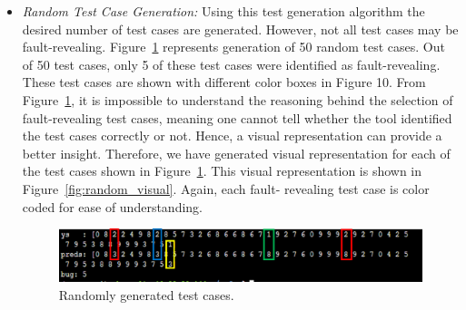 \begin{itemize}
	\item \textit{Random Test Case Generation:} Using this test generation algorithm the desired number of test cases are generated. However, not all test cases may be fault-revealing. Figure~\ref{fig:random} represents generation of 50 random test cases. Out of 50 test cases, only 5 of these test cases were identified as fault-revealing. These test cases are shown with different color boxes in Figure 10. From Figure~\ref{fig:random}, it is impossible to understand the reasoning behind the selection of fault-revealing test cases, meaning one cannot tell whether the tool identified the test cases correctly or not. Hence, a visual representation can provide a better insight. Therefore, we have generated visual representation for each of the test cases shown in Figure~\ref{fig:random}. This visual representation is shown in Figure~\ref{fig:random_visual}. Again, each fault- revealing test case is color coded for ease of understanding. 
	\begin{figure}[h]
		\includegraphics[width=\linewidth]{Fig/random.png}
		\caption{Randomly generated test cases.}
		\label{fig:random}
	\end{figure}


\end{itemize}

